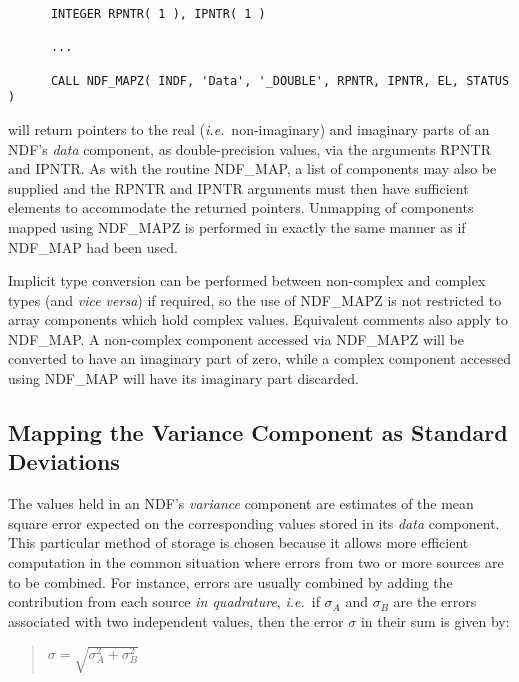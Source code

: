 \documentclass[twoside,11pt]{article}
\newcommand{\xlabel}[1]{}
\newcommand{\st}[1]{{\em{#1}}}
\begin{document}
\small
\begin{verbatim}
      INTEGER RPNTR( 1 ), IPNTR( 1 )

      ...

      CALL NDF_MAPZ( INDF, 'Data', '_DOUBLE', RPNTR, IPNTR, EL, STATUS )
\end{verbatim}
\normalsize

will return pointers to the real (\st{i.e.}\ non-imaginary\/) and imaginary parts
of an NDF's \st{data\/} component, as double-precision values, via the arguments
RPNTR and IPNTR. 
As with the routine NDF\_MAP, a list of components may also be supplied and
the RPNTR and IPNTR arguments must then have sufficient elements to accommodate
the returned pointers. 
Unmapping of components mapped using NDF\_MAPZ is performed in exactly  the same
manner as if NDF\_MAP had been used.

Implicit type conversion can be performed between non-complex and complex types
(and \st{vice versa\/}) if required, so the use of NDF\_MAPZ is not restricted to
array components which hold complex values.
Equivalent comments also apply to NDF\_MAP.
A non-complex component accessed via NDF\_MAPZ will be converted to have an
imaginary part of zero, while a complex component accessed using NDF\_MAP
will have its imaginary part discarded. 

\subsection{\xlabel{mapping_the_variance_component_as_standard_deviations}\label{ss:stddev}Mapping the Variance Component as Standard Deviations}

The values held in an NDF's \st{variance\/} component are estimates of the
mean square error expected on the corresponding values stored in its
\st{data\/} component.  
This particular method of storage is chosen because it allows more efficient
computation in the common situation where errors from two or more sources
are to be combined. 
For instance, errors are usually combined by adding the contribution from
each source \st{in quadrature}, \st{i.e.}\ if $\sigma_{A}$ and
$\sigma_{B}$ are the errors associated with two independent values, then the
error $\sigma$ in their sum is given by: 

\small
\begin{quote}
\begin{center}
$\sigma = \sqrt{ \sigma_{A}^{2} + \sigma_{B}^{2} }$
\end{center}
\end{quote}
\normalsize
\end{document}
